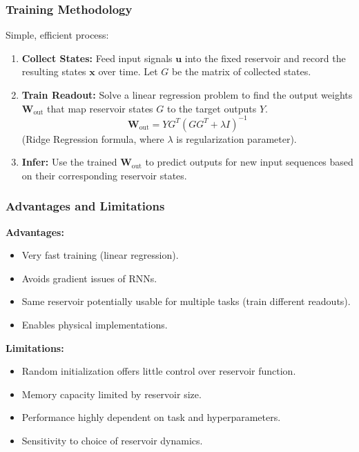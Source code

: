 \documentclass{beamer}
\begin{document}
\begin{frame}
    \frametitle{Training Methodology}
    Simple, efficient process:
    \begin{enumerate}
        \item \textbf{Collect States:} Feed input signals $\mathbf{u}$ into the fixed reservoir and record the resulting states $\mathbf{x}$ over time. Let $G$ be the matrix of collected states.
        \pause
        \item \textbf{Train Readout:} Solve a linear regression problem to find the output weights $\mathbf{W}_{\text{out}}$ that map reservoir states $G$ to the target outputs $Y$.
            \[
            \mathbf{W}_{\text{out}} = Y G^T \left(G G^T + \lambda I\right)^{-1}
            \]
            (Ridge Regression formula, where $\lambda$ is regularization parameter).
        \pause
        \item \textbf{Infer:} Use the trained $\mathbf{W}_{\text{out}}$ to predict outputs for new input sequences based on their corresponding reservoir states.
    \end{enumerate}
\end{frame}

\begin{frame}
    \frametitle{Advantages and Limitations}
    \textbf{Advantages:}
    \begin{itemize}
        \item Very fast training (linear regression).
        \item Avoids gradient issues of RNNs.
        \item Same reservoir potentially usable for multiple tasks (train different readouts).
        \item Enables physical implementations.
    \end{itemize}
    \pause
    \textbf{Limitations:}
    \begin{itemize}
        \item Random initialization offers little control over reservoir function.
        \item Memory capacity limited by reservoir size.
        \item Performance highly dependent on task and hyperparameters.
        \item Sensitivity to choice of reservoir dynamics.
    \end{itemize}
\end{frame}

\end{document}
